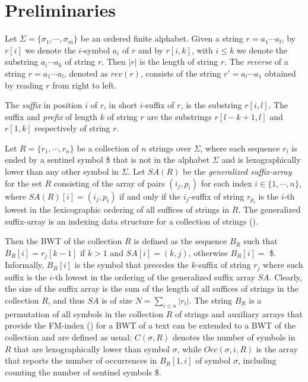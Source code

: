 \documentclass[runningheads,envcountsame,a4paper]{llncs}
\begin{document}
\section{Preliminaries}
Let $\Sigma = \{\sigma_1, \cdots, \sigma_m\}$ be an ordered  finite alphabet.
Given a string $r = a_1 \cdots a_l$, by $r[i]$ we denote the $i$-symbol $a_i$  of $r$ and by $r[i,k]$, with $i \leq k$  we denote  the substring $a_i \cdots a_k$ of string $r$.
Then $|r|$ is the length of string $r$. The {\em reverse} of a string $r = a_1 \cdots a_l$, denoted as $rev(r)$,  consists of the string $r' = a_l \cdots a_1$ obtained by reading $r$ from right to left.

The  {\em suffix} in position $i$ of $r$, in short  $i$-suffix of $r$,  is the substring $r[i, l]$. The   suffix and {\em prefix} of length $k$ of string $r$ are the substrings
$r[l-k +1, l]$ and $r[1, k]$ respectively of string $r$.

Let $R = \{r_1, \cdots, r_n\}$ be a collection of $n$ strings over $\Sigma$, where each sequence $r_i$ is ended by  a sentinel  symbol \$ that is not in the alphabet $\Sigma$ and is lexographically lower than any other symbol in $\Sigma$.
Let $SA(R)$ be the {\em generalized suffix-array} for the set $R$ consisting of  the array of  pairs $(i_j, p_i)$ for each index $i \in \{1, \cdots, n \}$, where
$SA(R)[i]=  (i_j, p_i)$ if and only if  the $i_j$-suffix of string $r_{p_i}$ is the $i$-th lowest in the lexicographic ordering of all suffices of strings in $R$. The generalized suffix-array is an indexing data structure for a collection of strings (\cite{Shi1996}).

Then the BWT of the collection $R$ is defined as the sequence $B_R$ such that $B_R[i]=r_{j}[k -1]$ if  $k > 1$ and   $SA[i] = (k,j)$, otherwise $B_R[i]= $ \$.
Informally, $B_R[i]$ is the symbol that precedes the  $k$-suffix  of  string $r_j$ where such suffix is the $i$-th lowest in  the ordering  of the generalized suffix array $SA$.
Clearly, the size of the suffix array is the sum of the length of all suffices of  strings in the collection $R$, and thus $SA$ is of size $N = \sum_{i \leq n}|r_i|$.
The string $B_R$ is a permutation of all symbols in the collection $R$ of strings and auxiliary arrays  that provide the FM-index (\cite{Ferragina2000}) for a BWT  of a text can be extended to a BWT of the collection and are defined as usual: $C(\sigma, R)$ denotes the number of symbols in $R$ that are lexographically lower than symbol $\sigma$, while $Occ(\sigma, i, R)$ is the array that reports the number of occurrences in $B_R[1, i]$ of symbol $\sigma$, including counting the number of sentinel symbols \$.
\end{document}
